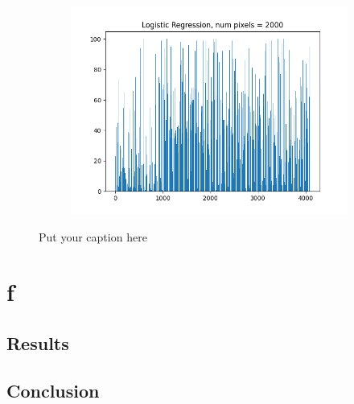 \documentclass{article}
\begin{document}
\begin{figure}[H]
\begin{subfigure}{.33\textwidth}
  \label{fig:sub-second}
\end{subfigure}
\begin{subfigure}{.33\textwidth}
  \centering
  \includegraphics[width=1\linewidth]{2e/Logistic Regression, 2000.png}  
  
  \label{fig:sub-second}
\end{subfigure}
\caption{Put your caption here}
\label{feet histo 2d}
\end{figure}
\newpage
\section{f}
\subsection{Results}
\subsection{Conclusion}
\end{document}
